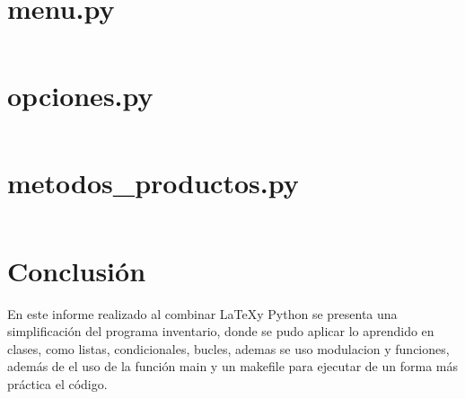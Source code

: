 \documentclass[12pt]{article}
\begin{document}
\section{menu.py}
\inputminted[fontsize=\small, breaklines=true]{python}{Codigo/menu.py}

\section{opciones.py}
\inputminted[fontsize=\small, breaklines=true]{python}{Codigo/opciones.py}

\section{metodos\_productos.py}
\inputminted[fontsize=\small, breaklines=true]{python}{Codigo/metodos_productos.py}

\section{Conclusión}

En este informe realizado al combinar \LaTeX y Python se presenta una simplificación del programa inventario, donde se pudo aplicar lo aprendido en clases, como listas, condicionales, bucles, ademas se uso modulacion y funciones, además de el uso de la función main y un makefile para ejecutar de un forma más práctica el código.
\end{document}
